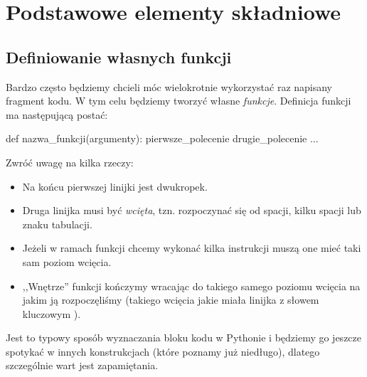 % 
% 
% 
% 

\section{Podstawowe elementy składniowe}

\subsection{Definiowanie własnych funkcji}

Bardzo często będziemy chcieli móc wielokrotnie wykorzystać raz napisany fragment kodu.
W tym celu będziemy tworzyć własne \emph{funkcje}. Definicja funkcji ma następującą postać:

\begin{CodeFrame*}[python]{}
def nazwa_funkcji(argumenty):
  pierwsze_polecenie
  drugie_polecenie
  ...
\end{CodeFrame*}

\noindent
Zwróć uwagę na kilka rzeczy:
\begin{itemize}
	\item Na końcu pierwszej linijki jest dwukropek.
	\item Druga linijka musi być \emph{wcięta}, tzn. rozpoczynać się od spacji, kilku spacji lub znaku tabulacji.
	\item Jeżeli w ramach funkcji chcemy wykonać kilka instrukcji muszą one mieć taki sam poziom wcięcia.
	\item ,,Wnętrze'' funkcji kończymy wracając do takiego samego poziomu wcięcia na jakim ją rozpoczęliśmy
	      (takiego wcięcia jakie miała linijka z słowem kluczowym ).
\end{itemize}\vspace{-4pt}
Jest to typowy sposób wyznaczania bloku kodu w Pythonie i będziemy go jeszcze spotykać w innych konstrukcjach (które poznamy już niedługo), dlatego szczególnie wart jest zapamiętania.

